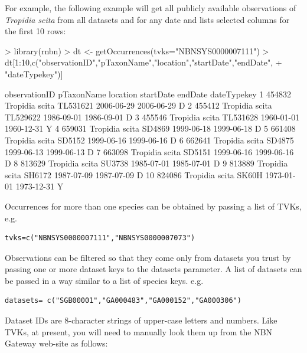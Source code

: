\documentclass{article}
\begin{document}
For example, the following example will get all publicly available observations
of \emph{Tropidia scita} from all datasets and for any date and lists selected
columns for the first 10 rows:

\begin{Schunk}
\begin{Sinput}
> library(rnbn)
> dt <- getOccurrences(tvks="NBNSYS0000007111")
> dt[1:10,c("observationID","pTaxonName","location","startDate","endDate",
+           "dateTypekey")]
\end{Sinput}
\begin{Soutput}
   observationID     pTaxonName location  startDate    endDate dateTypekey
1         454832 Tropidia scita TL531621 2006-06-29 2006-06-29          D 
2         455412 Tropidia scita TL529622 1986-09-01 1986-09-01          D 
3         455546 Tropidia scita TL531628 1960-01-01 1960-12-31          Y 
4         659031 Tropidia scita   SD4869 1999-06-18 1999-06-18          D 
5         661408 Tropidia scita   SD5152 1999-06-16 1999-06-16          D 
6         662641 Tropidia scita   SD4875 1999-06-13 1999-06-13          D 
7         663098 Tropidia scita   SD5151 1999-06-16 1999-06-16          D 
8         813629 Tropidia scita   SU3738 1985-07-01 1985-07-01          D 
9         813889 Tropidia scita   SH6172 1987-07-09 1987-07-09          D 
10        824086 Tropidia scita    SK60H 1973-01-01 1973-12-31          Y 
\end{Soutput}
\end{Schunk}

Occurrences for more than one species can be obtained by  passing a list of
TVKs, e.g. 
\begin{verbatim}
tvks=c("NBNSYS0000007111","NBNSYS0000007073")
\end{verbatim}

Observations can be filtered so that they come only from datasets you trust
by passing one or more dataset keys to the datasets parameter. A list
of datasets can be passed in a way similar to a list of species keys. e.g.
\begin{verbatim}
datasets= c("SGB00001","GA000483","GA000152","GA000306")
\end{verbatim}

Dataset IDs are 8-character strings of upper-case letters and numbers. Like
TVKs, at present, you will need to manually look them up from the NBN Gateway 
web-site as follows:
\end{document}
